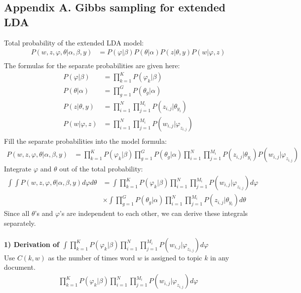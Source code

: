 \subsection{Appendix A. Gibbs sampling for extended LDA}\label{ref:derivation}
Total probability of the extended LDA model:
\begin{align}
P(w, z, \varphi, \theta | \alpha, \beta, y) &= P(\varphi | \beta)P(\theta | \alpha)P(z | \theta, y)P(w | \varphi, z)\\
\end{align}
The formulas for the separate probabilities are given here:
\begin{align}
P(\varphi | \beta) &= \prod\limits_{k=1}^K P(\varphi_k|\beta)\\
P(\theta | \alpha) &= \prod\limits_{g=1}^G P(\theta_g|\alpha)\\
P(z | \theta, y) &= \prod\limits_{i=1}^N \prod\limits_{j=1}^{M_i} P(z_{i,j}|\theta_{y_i})\\
P(w | \varphi, z) &= \prod\limits_{i=1}^N \prod\limits_{j=1}^{M_i} P(w_{i,j}|\varphi_{z_{i,j}})\\
\end{align}
Fill the separate probabilities into the model formula:
\begin{align}
P(w, z, \varphi, \theta | \alpha, \beta, y) &= \prod\limits_{k=1}^K P(\varphi_k|\beta) \prod\limits_{g=1}^G P(\theta_g|\alpha) \prod^N_{i=1}\prod^{M_i}_{j=1} P(z_{i,j}|\theta_{y_i}) P(w_{i,j}|\varphi_{z_{i,j}})
\end{align}
Integrate $\varphi$ and $\theta$ out of the total probability:
\begin{align}
\int \int P(w, z, \varphi, \theta | \alpha, \beta, y) d\varphi d\theta &= \int \prod\limits_{k=1}^K P(\varphi_k|\beta) \prod^N_{i=1}\prod^{M_i}_{j=1} P(w_{i,j}|\varphi_{z_{i,j}}) d\varphi\\
&\times \int \prod\limits_{g=1}^G P(\theta_g|\alpha) \prod^N_{i=1}\prod^{M_i}_{j=1} P(z_{i,j}|\theta_{y_i}) d\theta
\end{align}
Since all $\theta$'s and $\varphi$'s are independent to each other, we can derive these integrals separately.\\~\\
\textbf{1) Derivation of $\int \prod\limits_{k=1}^K P(\varphi_k|\beta) \prod^N_{i=1}\prod^{M_i}_{j=1} P(w_{i,j}|\varphi_{z_{i,j}}) d\varphi$}
~\\Use $C(k,w)$ as the number of times word $w$ is assigned to topic $k$ in any document.
\begin{align}
\prod\limits_{k=1}^K P(\varphi_k|\beta) \prod^N_{i=1}\prod^{M_i}_{j=1} P(w_{i,j}|\varphi_{z_{i,j}}) d\varphi
\end{align}

